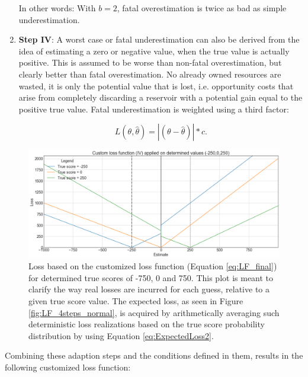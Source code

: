 \begin{enumerate}
			In other words: With $b = 2$, fatal overestimation is twice as bad as simple underestimation.
			
			\item \textbf{Step IV}: A worst case or fatal underestimation can also be derived from the idea of estimating a zero or negative value, when the true value is actually positive. This is assumed to be worse than non-fatal overestimation, but clearly better than fatal overestimation. No already owned resources are wasted, it is only the potential value that is lost, i.e. opportunity costs that arise from completely discarding a reservoir with a potential gain equal to the positive true value. Fatal underestimation is weighted using a third factor:
					
			\begin{equation}\label{eq:LF_IV}
			L(\theta,\hat{\theta}) = |(\theta-\hat{\theta})|*c.
			\end{equation}			
		\end{enumerate}
		\begin{figure}[h]
			\includegraphics[width=1\textwidth]{Figures/LF4_det_values.png}
			\caption{Loss based on the customized loss function (Equation \ref{eq:LF_final}) for determined true scores of -750, 0 and 750. This plot is meant to clarify the way real losses are incurred for each guess, relative to a given true score value. The expected loss, as seen in Figure \ref{fig:LF_4steps_normal}, is acquired by arithmetically averaging such deterministic loss realizations based on the true score probability distribution by using Equation \ref{eq:ExpectedLoss2}.}\label{fig:LF4_det_values}
		\end{figure}
		
		Combining these adaption steps and the conditions defined in them, results in the following customized loss function:
		

